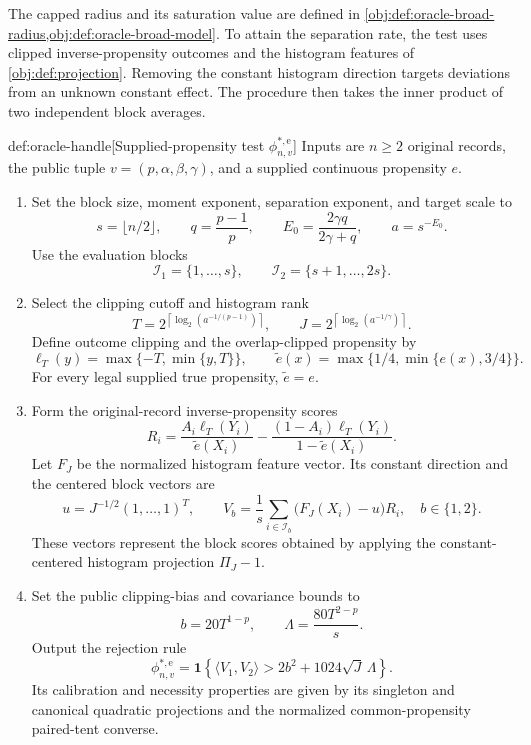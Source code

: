 \documentclass[11pt]{article}
\begin{document}
The capped radius  and its saturation value  are defined in \cref{obj:def:oracle-broad-radius,obj:def:oracle-broad-model}. To attain the separation rate, the test uses clipped inverse-propensity outcomes and the histogram features of \cref{obj:def:projection}. Removing the constant histogram direction targets deviations from an unknown constant effect. The procedure then takes the inner product of two independent block averages.

\begin{algorithmv}{def:oracle-handle}[Supplied-propensity test \(\phi^{*,\mathrm e}_{n,v}\)]
Inputs are \(n\ge2\) original records, the public tuple \(v=(p,\alpha,\beta,\gamma)\), and a supplied continuous propensity \(e\).
\begin{enumerate}
\item Set the block size, moment exponent, separation exponent, and target scale to
\[
s=\lfloor n/2\rfloor,
\qquad
q=\frac{p-1}{p},
\qquad
E_0=\frac{2\gamma q}{2\gamma+q},
\qquad
a=s^{-E_0}.
\]
Use the evaluation blocks
\[
\mathcal I_1=\{1,\ldots,s\},
\qquad
\mathcal I_2=\{s+1,\ldots,2s\}.
\]
\item Select the clipping cutoff and histogram rank
\[
T=2^{\left\lceil\log_2(a^{-1/(p-1)})\right\rceil},
\qquad
J=2^{\left\lceil\log_2(a^{-1/\gamma})\right\rceil}.
\]
Define outcome clipping and the overlap-clipped propensity by
\[
\ell_T(y)=\max\{-T,\min\{y,T\}\},
\qquad
\widetilde e(x)=\max\{1/4,\min\{e(x),3/4\}\}.
\]
For every legal supplied true propensity, \(\widetilde e=e\).
\item Form the original-record inverse-propensity scores
\[
R_i=
\frac{A_i\ell_T(Y_i)}{\widetilde e(X_i)}
-
\frac{(1-A_i)\ell_T(Y_i)}{1-\widetilde e(X_i)}.
\]
Let \(F_J\) be the normalized histogram feature vector. Its constant direction and the centered block vectors are
\[
u=J^{-1/2}(1,\ldots,1)^T,
\qquad
V_b=\frac1s\sum_{i\in\mathcal I_b}
\bigl(F_J(X_i)-u\bigr)R_i,
\quad b\in\{1,2\}.
\]
These vectors represent the block scores obtained by applying the constant-centered histogram projection \(\Pi_J-1\).
\item Set the public clipping-bias and covariance bounds to
\[
b=20T^{1-p},
\qquad
\Lambda=\frac{80T^{2-p}}s.
\]
Output the rejection rule
\[
\phi^{*,\mathrm e}_{n,v}
=
\mathbf 1\!\left\{
\langle V_1,V_2\rangle
>
2b^2+1024\sqrt J\,\Lambda
\right\}.
\]
Its calibration and necessity properties are given by its singleton and canonical quadratic projections and the normalized common-propensity paired-tent converse.
\end{enumerate}
\end{algorithmv}
\end{document}
